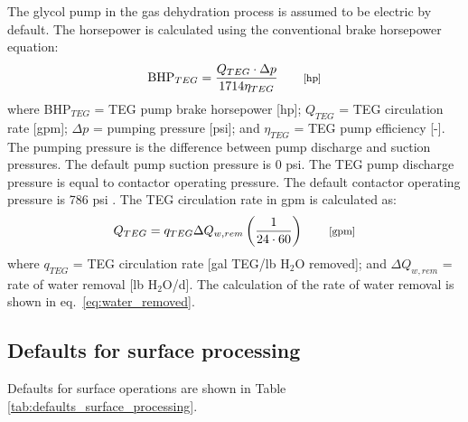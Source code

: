\documentclass[11pt]{report}
\newcommand{\marg}[1]{{\footnotesize\textit{\textcolor{stanford}{'#1'}}}}
\newcommand{\marginnote}[1]{\marginpar{\marg{#1}}}
\begin{document}
The glycol pump in the gas dehydration process is assumed to be electric by default. The horsepower is calculated using the conventional brake horsepower equation: \marginnote{Surface \\ Processing 2.2.2.3}
\begin{equation} \label{eq:BHP_glycol_pump}
\text{BHP}_{TEG}=\frac{Q_{TEG}\cdot \Delta p}{1714 \eta_{TEG}} \quad\quad \begin{footnotesize}\text{[hp]} \end{footnotesize}
\end{equation}
where BHP$_{TEG}$ = TEG pump brake horsepower [hp]; $Q_{TEG}$ = TEG circulation rate [gpm]; $\Delta p$ = pumping pressure [psi]; and $\eta_{TEG}$ = TEG pump efficiency [-]. The pumping pressure is the difference between pump discharge and suction pressures. The default pump suction pressure is 0 psi. The TEG pump discharge pressure is equal to contactor operating pressure. The default contactor operating pressure is 786 psi \cite[p. 160]{Manning1991}. The TEG circulation rate in gpm is calculated as: \marginnote{Surface \\ Processing 2.2.2.1.5}
\begin{equation} \label{eq:glycol_circulation_rate}
Q_{TEG}= q_{TEG} \Delta Q_{w,rem} \left( \frac{1}{24\cdot60} \right) \quad
\quad \begin{footnotesize}\text{[gpm]} \end{footnotesize}
\end{equation}
where $q_{TEG}$ = TEG circulation rate [gal TEG/lb H$_{2}$O removed]; and $\Delta Q_{w,rem}$ = rate of water removal [lb H$_{2}$O/d]. The calculation of the rate of water removal is shown in eq.\ \eqref{eq:water_removed}.


\subsection{Defaults for surface processing}

Defaults for surface operations are shown in Table \ref{tab:defaults_surface_processing}.
\end{document}
